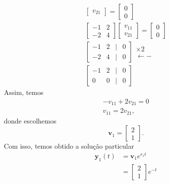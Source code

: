 \begin{ex}
\begin{gather}
\begin{bmatrix}
      v_{21}
    \end{bmatrix} =
    \begin{bmatrix}
      0 \\
      0
    \end{bmatrix} \\
        \begin{bmatrix}
      -1 & 2 \\
      -2 & 4
    \end{bmatrix}
    \begin{bmatrix}
      v_{11} \\
      v_{21}
    \end{bmatrix} =
    \begin{bmatrix}
      0 \\
      0
    \end{bmatrix} \\
    \begin{bmatrix}
      -1 & 2 & | & 0 \\
      -2 & 4 & | & 0
    \end{bmatrix}
    \begin{matrix}
      \times 2 \\
      \leftarrow -
    \end{matrix} \\
    \begin{bmatrix}
      -1 & 2 & | & 0 \\
      0 & 0 & | & 0
    \end{bmatrix}    
  \end{gather}
Assim, temos
\begin{gather}
  -v_{11} + 2v_{21} = 0 \\
  v_{11} = 2v_{21},
\end{gather}
donde escolhemos
\begin{equation}
\pmb{v}_1 =
\begin{bmatrix}
  2 \\
  1
\end{bmatrix}.
\end{equation}
Com isso, temos obtido a solução particular
\begin{align}
  \pmb{y}_1(t) &= \pmb{v}_1e^{r_1t} \\
               &=
                 \begin{bmatrix}
                   2\\
                   1
                 \end{bmatrix}e^{-t}
\end{align}



\end{ex}
